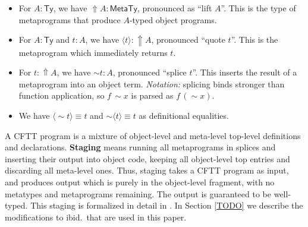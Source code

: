 \documentclass[acmsmall,screen,review,anonymous]{acmart}
\newcommand{\msf}[1]{\mathsf{#1}}
\newcommand{\bs}[1]{\boldsymbol{#1}}
\newcommand{\Lift}{{\Uparrow}}
\newcommand{\spl}{{\bs{\sim}}}
\newcommand{\ql}{{\bs{\langle}}}
\newcommand{\qr}{{\bs{\rangle}}}
\newcommand{\MTy}{\msf{MetaTy}}
\newcommand{\Ty}{\msf{Ty}}
\theoremstyle{remark}
\begin{document}
\begin{itemize}
\item For $A : \Ty$, we have $\Lift A : \MTy$, pronounced as ``lift $A$''. This is
      the type of metaprograms that produce $A$-typed object programs.
\item For $A : \Ty$ and $t : A$, we have $\ql t \qr : \Lift A$, pronounced ``quote $t$''. This
      is the metaprogram which immediately returns $t$.
\item For $t : \Lift A$, we have $\spl t : A$, pronounced ``splice $t$''. This
  inserts the result of a metaprogram into an object term. \emph{Notation:}
  splicing binds stronger than function application, so $f\,\spl x$ is parsed as
  $f\,(\spl x)$.
\item We have $\ql \spl t \qr \equiv t$ and $\spl \ql t \qr \equiv t$ as definitional equalities.
\end{itemize}

A CFTT program is a mixture of object-level and meta-level top-level definitions
and declarations. \textbf{Staging} means running all metaprograms in splices and
inserting their output into object code, keeping all object-level top entries
and discarding all meta-level ones. Thus, staging takes a CFTT program as input,
and produces output which is purely in the object-level fragment, with no
metatypes and metaprograms remaining. The output is guaranteed to be
well-typed. This staging is formalized in detail in \cite{TODO}. In Section
\ref{TODO} we describe the modifications to ibid.\ that are used in this paper.
\end{document}
